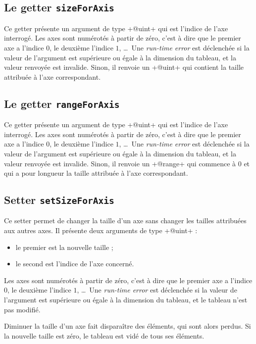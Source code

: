 \subsection{Le getter \texttt{sizeForAxis}}

Ce getter présente un argument de type \ggs+@uint+ qui est l'indice de l'axe interrogé. Les axes sont numérotés à partir de zéro, c'est à dire que le premier axe a l'indice $0$, le deuxième l'indice $1$, \dots~Une \emph{run-time error} est déclenchée si la valeur de l'argument est supérieure ou égale à la dimension du tableau, et la valeur renvoyée est invalide. Sinon, il renvoie un \ggs+@uint+ qui contient la taille attribuée à l'axe correspondant.


\subsection{Le getter \texttt{rangeForAxis}}

Ce getter présente un argument de type \ggs+@uint+ qui est l'indice de l'axe interrogé. Les axes sont numérotés à partir de zéro, c'est à dire que le premier axe a l'indice $0$, le deuxième l'indice $1$, \dots~Une \emph{run-time error} est déclenchée si la valeur de l'argument est supérieure ou égale à la dimension du tableau, et la valeur renvoyée est invalide. Sinon, il renvoie un \ggs+@range+ qui commence à $0$ et qui a pour longueur la taille attribuée à l'axe correspondant.




\subsection{Setter \texttt{setSizeForAxis}}

Ce setter permet de changer la taille d'un axe sans changer les tailles attribuées aux autres axes. Il présente deux arguments de type \ggs+@uint+ :
\begin{itemize}
  \item le premier est la nouvelle taille ;
  \item le second est l'indice de l'axe concerné.
\end{itemize}

Les axes sont numérotés à partir de zéro, c'est à dire que le premier axe a l'indice $0$, le deuxième l'indice $1$, \dots~Une \emph{run-time error} est déclenchée si la valeur de l'argument est supérieure ou égale à la dimension du tableau, et le tableau n'est pas modifié.
 
Diminuer la taille d'un axe fait disparaître des éléments, qui sont alors perdus. Si la nouvelle taille est zéro, le tableau est vidé de tous ses éléments.

